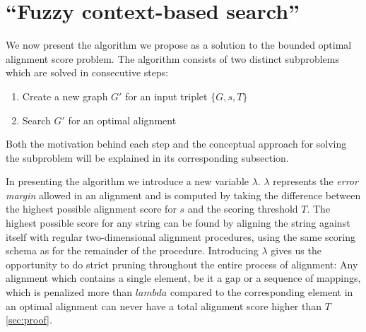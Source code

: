 \documentclass[thesis.tex]{subfiles}
\begin{document}
\section{``Fuzzy context-based search''}
We now present the algorithm we propose as a solution to the bounded optimal alignment score problem. The algorithm consists of two distinct subproblems which are solved in consecutive steps:
\begin{enumerate}
  \item Create a new graph $G'$ for an input triplet $\{G, s, T\}$
  \item Search $G'$ for an optimal alignment
\end{enumerate}
Both the motivation behind each step and the conceptual approach for solving the subproblem will be explained in its corresponding subsection.\\
\par\noindent
In presenting the algorithm we introduce a new variable $\lambda$. $\lambda$ represents the \textit{error margin} allowed in an alignment and is computed by taking the difference between the highest possible alignment score for $s$ and the scoring threshold $T$. The highest possible score for any string can be found by aligning the string against itself with regular two-dimensional alignment procedures, using the same scoring schema as for the remainder of the procedure. Introducing $\lambda$ gives us the opportunity to do strict pruning throughout the entire process of alignment: Any alignment which contains a single element, be it a gap or a sequence of mappings, which is penalized more than $lambda$ compared to the corresponding element in an optimal alignment can never have a total alignment score higher than $T$\ref{sec:proof}.
\end{document}
